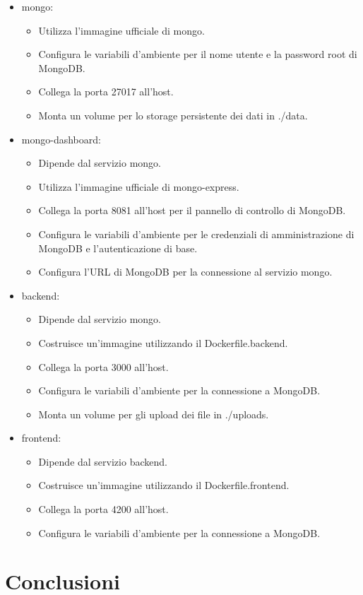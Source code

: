 \documentclass[12pt,a4paper,openright,twoside]{book}
\begin{document}
\begin{itemize}
    \item mongo:
    \begin{itemize}
        \item Utilizza l'immagine ufficiale di mongo.
        \item Configura le variabili d'ambiente per il nome utente e la password root di MongoDB.
        \item Collega la porta 27017 all'host.
        \item Monta un volume per lo storage persistente dei dati in ./data.
    \end{itemize}
    \item mongo-dashboard:
    \begin{itemize}
        \item Dipende dal servizio mongo.
        \item Utilizza l'immagine ufficiale di mongo-express.
        \item Collega la porta 8081 all'host per il pannello di controllo di MongoDB.
        \item Configura le variabili d'ambiente per le credenziali di amministrazione di MongoDB e l'autenticazione di base.
        \item Configura l'URL di MongoDB per la connessione al servizio mongo.
    \end{itemize}
    \item backend:
    \begin{itemize}
        \item Dipende dal servizio mongo.
        \item Costruisce un'immagine utilizzando il Dockerfile.backend.
        \item Collega la porta 3000 all'host.
        \item Configura le variabili d'ambiente per la connessione a MongoDB.
        \item Monta un volume per gli upload dei file in ./uploads.
    \end{itemize}
    \item frontend:
    \begin{itemize}
        \item Dipende dal servizio backend.
        \item Costruisce un'immagine utilizzando il Dockerfile.frontend.
        \item Collega la porta 4200 all'host.
        \item Configura le variabili d'ambiente per la connessione a MongoDB.
    \end{itemize}
\end{itemize}

\chapter{Conclusioni}



\end{document}
